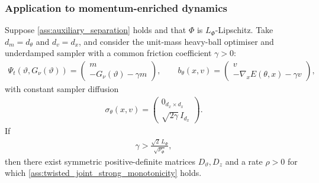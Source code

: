 \subsubsection{Application to momentum-enriched dynamics}
\label{app:mpgd_result}

\begin{proposition}
Suppose \ref{ass:auxiliary_separation} holds and that
$\Phi$ is $L_\Phi$-Lipschitz.  Take $d_m=d_\theta$ and $d_v=d_x$, and
consider the unit-mass heavy-ball optimiser and underdamped sampler with a
common friction coefficient $\gamma>0$:
\begin{align*}
\Psi_t(\vartheta,G_\nu(\vartheta))
=
\begin{pmatrix}
m\\
-G_\nu(\vartheta)-\gamma m
\end{pmatrix},
\qquad
b_\theta(x,v)
=
\begin{pmatrix}
v\\
-\nabla_xE(\theta,x)-\gamma v
\end{pmatrix},
\end{align*}
with constant sampler diffusion
\begin{align*}
\sigma_\theta(x,v)
=
\begin{pmatrix}
0_{d_x\times d_x}\\
\sqrt{2\gamma}\,I_{d_x}
\end{pmatrix}.
\end{align*}
If
\begin{align*}
\gamma>\frac{\sqrt2\,L_\Phi}{\sqrt{\rho_\Phi}},
\end{align*}
then there exist symmetric positive-definite matrices
$D_\vartheta,D_z$ and a rate $\rho>0$ for which
\ref{ass:twisted_joint_strong_monotonicity} holds.
\end{proposition}

